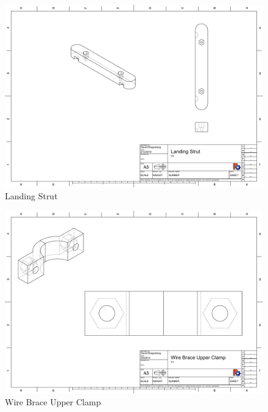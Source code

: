 \documentclass[pdftex,11pt]{article}
\begin{document}
\begin{figure}[!h]
	\centering
		\includegraphics[width=1\textwidth]{./graphics/Landing_strut-eps-converted-to.pdf}
	\caption{Landing Strut}
	\label{fig:landingStrut}
\end{figure}

\begin{figure}[!h]
	\centering
		\includegraphics[width=1\textwidth]{./graphics/wire_brace_uper_clamp-eps-converted-to.pdf}
	\caption{Wire Brace Upper Clamp}
	\label{fig:wirebraceupperclamp}
\end{figure}
\end{document}
